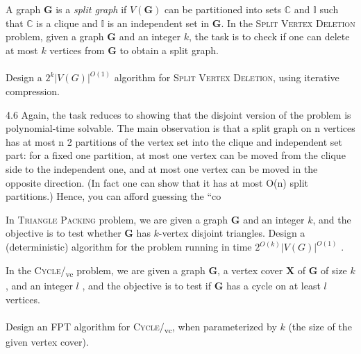 \documentclass[11pt]{exam}
\begin{document}
\begin{questions}
\question A graph $\pmb{G}$ is a \emph{split graph} if $V(\pmb{G})$ can be partitioned into sets $\mathbb{C}$ and $\mathbb{I}$ such that $\mathbb{C}$ is a clique and $\mathbb{I}$ is an independent set in $\pmb{G}$. In the \textsc{Split Vertex Deletion} problem, given a graph $\pmb{G}$ and an integer $k$, the task is to check if one can delete at most $k$ vertices from $\pmb{G}$ to obtain a split graph.\\\\
Design a $2^k|V(G)|^{O(1)}$ algorithm for \textsc{Split Vertex Deletion}, using iterative compression.
\begin{solution}

    4.6 Again, the task reduces to showing that the disjoint version of the problem is
polynomial-time solvable.
The main observation is that a split graph on n vertices has at most n 2 partitions of
the vertex set into the clique and independent set part: for a fixed one partition, at most
one vertex can be moved from the clique side to the independent one, and at most one
vertex can be moved in the opposite direction. (In fact one can show that it has at most
O(n) split partitions.) Hence, you can afford guessing the “co
\end{solution}

\question In \textsc{Triangle Packing} problem, we are given a graph $\pmb{G}$ and an integer $k$, and the objective is to test whether $\pmb{G}$ has $k$-vertex disjoint triangles. Design a (deterministic) algorithm for the problem running in time $2^{O(k)}|V(G)|^{O(1)}$ .
\begin{solution}

\end{solution}

\question In the \textsc{Cycle}/\textsubscript{vc} problem, we are given a graph $\pmb{G}$, a vertex cover $\pmb{X}$ of $\pmb{G}$ of size $k$, and an integer $l$ , and the objective is to test if $\pmb{G}$ has a cycle on at least $l$ vertices.\\\\
Design an FPT algorithm for \textsc{Cycle}/\textsubscript{vc}, when parameterized by $k$ (the size of the given vertex cover).
\begin{solution}

\end{solution}


\end{questions}
\end{document}

